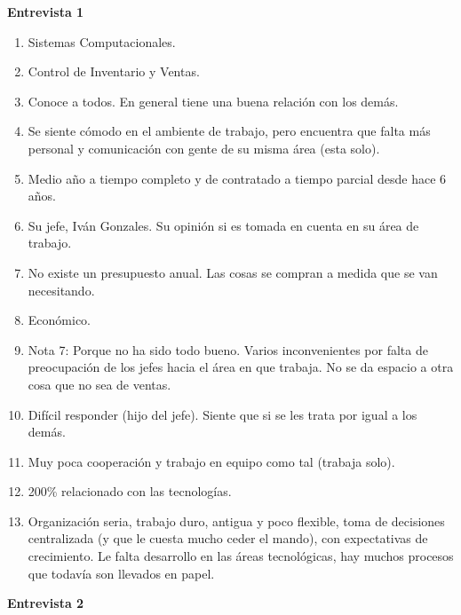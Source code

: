 \textbf{Entrevista 1}\\
\begin{enumerate}
	\item Sistemas Computacionales.
	\item Control de Inventario y Ventas.
	\item Conoce a todos. En general tiene una buena relación con los demás.
	\item Se siente cómodo en el ambiente de trabajo, pero encuentra que falta más personal y comunicación con gente de su misma área (esta solo).
	\item Medio año a tiempo completo y de contratado a tiempo parcial desde hace 6 años.
	\item Su jefe, Iván Gonzales. Su opinión si es tomada en cuenta en su área de trabajo.
	\item No existe un presupuesto anual. Las cosas se compran a medida que se van necesitando.
	\item Económico.
	\item Nota 7: Porque no ha sido todo bueno. Varios inconvenientes por falta de preocupación de los jefes hacia el área en que trabaja.  No se da espacio a otra cosa que no sea de ventas.
	\item Difícil responder (hijo del jefe). Siente que si se les trata por igual a los demás.
	\item Muy poca cooperación y trabajo en equipo como tal (trabaja solo).
	\item 200\% relacionado con las tecnologías.
	\item Organización seria, trabajo duro, antigua y poco flexible, toma de decisiones centralizada (y que le cuesta mucho ceder el mando), con expectativas de crecimiento. Le falta desarrollo en las áreas tecnológicas, hay muchos procesos que todavía son llevados en papel.
\end{enumerate}
\newpage
\textbf{Entrevista 2}\\
